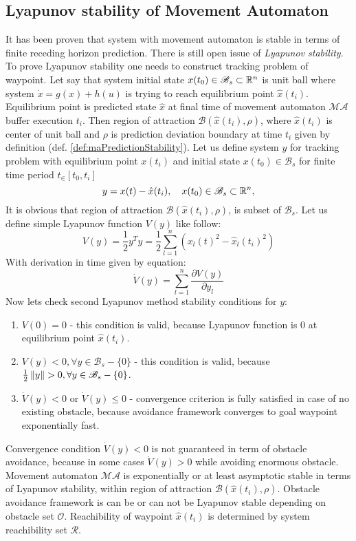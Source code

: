 \subsection{Lyapunov stability of Movement Automaton}\label{s:maLyapunov}
\noindent It has been proven that system with movement automaton is stable in terms of finite receding horizon prediction. There is still open issue of \textit{Lyapunov stability}. To prove Lyapunov stability one needs to construct tracking problem of waypoint. Let say that system initial state $x(t_0)\in \mathscr{B}_s \subset \mathbb{R}^n$ is unit ball where system $\dot{x} = g(x) + h(u)$ is trying to reach equilibrium point $\hat{x}(t_i)$. Equilibrium point is predicted state $\hat{x}$ at final time of movement automaton $\mathscr{MA}$ buffer execution $t_i$. Then region of attraction $\mathscr{B}(\hat{x}(t_i),\rho)$, where $\hat{x}(t_i)$ is center of unit ball and $\rho$ is prediction deviation boundary at time $t_i$ given by definition (def. \ref{def:maPredictionStability}). Let us define system $y$ for tracking problem with equilibrium point $x(t_i)$ and initial state $x(t_0)\in\mathscr{B}_s$ for finite time period $t_\in[t_0,t_i]$
\begin{equation}
    y = {x}(t)-\hat{x}(t_i), \quad x(t_0)\in\mathscr{B}_s\subset\mathbb{R}^n, 
\end{equation}
\noindent It is obvious that region of attraction $\mathscr{B}(\hat{x}(t_i),\rho)$, is subset of $\mathscr{B}_s$. Let us define simple Lyapunov function $V(y)$ like follow:
\begin{equation}
    V(y) = \frac{1}{2}y^Ty = \frac{1}{2}\sum_{l=1}^n\left(x_l(t)^2-\hat{x}_l(t_i)^2\right)
\end{equation}
\noindent With derivation in time given by equation:
\begin{equation}
    \dot{V}(y)= \sum_{l=1}^n \frac{\partial V(y)}{\partial y_l}
\end{equation}
\noindent Now lets check second Lyapunov method stability conditions for $y$:
\begin{enumerate}
    \item $V(0)=0$ - this condition is valid, because Lyapunov function is 0 at equilibrium point $\hat{x}(t_i)$.
    \item $V(y) < 0, \forall y\in\mathscr{B}_s-\{0\}$ - this condition is valid, because $\frac{1}{2}\left\lVert y\right\rVert>0,\forall y\in\mathscr{B}_s-\{0\}$.
    \item $\dot{V}(y)<0$ or $\dot{V}(y)\le0$ - convergence criterion is fully satisfied in case of no existing obstacle, because avoidance framework converges to goal waypoint exponentially fast.
\end{enumerate}
\noindent Convergence condition $\dot{V}(y)<0$ is not guaranteed in term of obstacle avoidance, because in some cases $\dot{V}(y)>0$ while avoiding enormous obstacle. Movement automaton $\mathscr{MA}$ is exponentially or at least asymptotic stable in terms of Lyapunov stability, within region of attraction $\mathscr{B}(\hat{x}(t_i),\rho)$. Obstacle avoidance framework is can be or can not be Lyapunov stable depending on obstacle set $\mathscr{O}$. Reachibility of waypoint $\hat{x}(t_i)$ is determined by system reachibility set $\mathscr{R}$.


